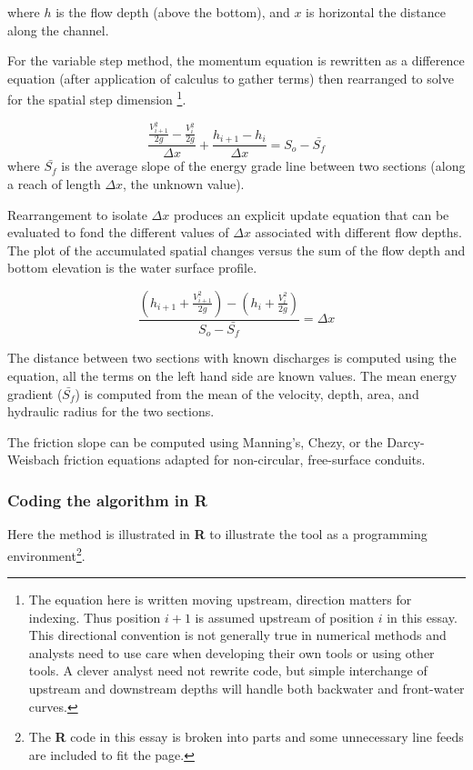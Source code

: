 where $h$ is the flow depth (above the bottom), and $x$ is horizontal the distance along the channel.

For the variable step method, the momentum equation is rewritten as a difference equation (after application of calculus to gather terms) then rearranged to solve for the spatial step dimension
\footnote{The equation here is written moving upstream, direction matters for indexing.  Thus position $i+1$ is assumed upstream of position $i$ in this essay.  This directional convention is not generally true in numerical methods and analysts need to use care when developing their own tools or using other tools.  A clever analyst need not rewrite code, but simple interchange of upstream and downstream depths will handle both backwater and front-water curves.}.

\begin{equation}
\frac{\frac{V_{i+1}^2}{2g} - \frac{V_{i}^2}{2g}}{\Delta x} + \frac{h_{i+1} - h_{i}}{\Delta x} = S_o - \bar{S_f}
\end{equation}
where $\bar{S_f}$ is the average slope of the energy grade line between two sections (along a reach of length $\Delta x$, the unknown value).

Rearrangement to isolate $\Delta x$ produces an explicit update equation that can be evaluated to fond the different values of $\Delta x$ associated with different flow depths.  The plot of the accumulated spatial changes versus the sum of the flow depth and bottom elevation is the water surface profile.

\begin{equation}
\frac{   (h_{i+1}  +  \frac{V_{i+1}^2}{2g}) - (h_{i} + \frac{V_{i}^2}{2g})}{S_o - \bar{S_f} }  = \Delta x
\end{equation}

The distance between two sections with known discharges is computed using the equation, all the terms on the left hand side are known values.  The mean energy gradient ($\bar{S_f}$) is computed from the mean of the velocity, depth, area, and hydraulic radius for the two sections.

The friction slope can be computed using Manning's, Chezy, or the Darcy-Weisbach friction equations adapted for non-circular, free-surface conduits.

\subsubsection{Coding the algorithm in  \textbf{R}}
Here the method is illustrated in \textbf{R} to illustrate the tool as a programming environment\footnote{The \textbf{R} code in this essay is broken into parts and some unnecessary line feeds are included to fit the page.}.

